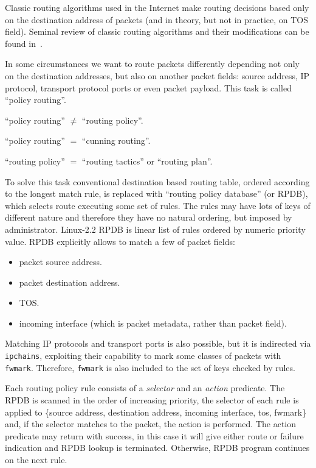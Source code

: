 Classic routing algorithms used in the Internet make routing decisions
based only on the destination address of packets (and in theory,
but not in practice, on TOS field). Seminal review of classic
routing algorithms and their modifications can be found in~\cite{RFC1812}.

In some circumstances we want to route packets differently depending not only
on the destination addresses, but also on another packet fields: source address,
IP protocol, transport protocol ports or even packet payload.
This task is called ``policy routing''.

\begin{NB}
  ``policy routing'' $\neq$ ``routing policy''.

\noindent	``policy routing'' $=$ ``cunning routing''.

\noindent	``routing policy'' $=$ ``routing tactics'' or ``routing plan''.
\end{NB}

To solve this task conventional destination based routing table, ordered
according to the longest match rule, is replaced with ``routing policy
database'' (or RPDB), which selects route
executing some set of rules. The rules may have lots of keys of different
nature and therefore they have no natural ordering, but imposed
by administrator. Linux-2.2 RPDB is linear list of rules
ordered by numeric priority value.
RPDB explicitly allows to match  a few of packet fields:

\begin{itemize}
\item packet source address.
\item packet destination address.
\item TOS.
\item incoming interface (which is packet metadata, rather than packet field).
\end{itemize}

Matching IP protocols and transport ports is also possible, but
it is indirected via \verb|ipchains|, exploiting their capability
to mark some classes of packets with \verb|fwmark|. Therefore,
\verb|fwmark| is also included to the set of keys checked by rules.

Each routing policy rule consists of a {\em selector\/} and an {\em action\/}
predicate. The RPDB is scanned in the order of increasing priority, the selector
of each rule is applied to \{source address, destination address, incoming
interface, tos, fwmark\} and, if the selector matches to the packet,
the action is performed.  The action predicate may return with success,
in this case it will give either route or failure indication
and RPDB lookup is terminated. Otherwise, RPDB program
continues on the next rule.

